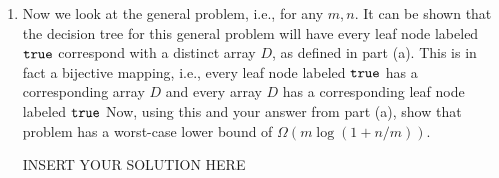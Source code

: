 \begin{enumerate}
\begin{solution}
\end{solution}


	\item Now we look at the general problem, i.e.,
	for any $m,n$. It can be shown that the decision
	tree for this general problem will have every
	leaf node labeled $\mathtt{true}$ correspond with
	a distinct array $D$, as defined in part (a).
	This is in fact a bijective mapping, i.e., every
	leaf node labeled $\mathtt{true}$ has a corresponding array $D$
	and every array $D$ has a corresponding leaf node
	labeled $\mathtt{true}$
	Now, using this and your answer from part (a),
	show that problem has a worst-case lower
	bound of $\Omega(m\log(1+n/m))$.

\begin{solution}   INSERT YOUR SOLUTION HERE   \end{solution}
\end{enumerate}